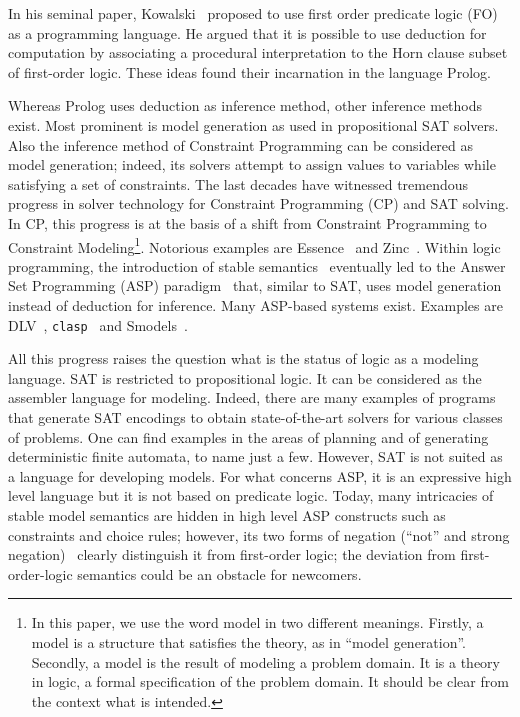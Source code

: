 \documentclass{tlp}
\renewcommand{\|}{\ensuremath{\,|\,}}
\renewcommand{\|}{\,|\,}
\begin{document}
In his seminal paper, Kowalski~\citeyear{ifip/Kowalski74} proposed to
use first order predicate logic (FO) as a programming language. He
argued that it is possible to use deduction for computation by
associating a procedural interpretation to the Horn clause subset of
first-order logic.  These ideas found their incarnation in the
language Prolog.

Whereas Prolog uses deduction as inference method, other
inference methods exist. Most prominent is model generation as used in
propositional SAT solvers. Also the inference method of Constraint
Programming can be considered as model generation; indeed, its solvers
attempt to assign values to variables while satisfying a set of
constraints.
%
The last decades have witnessed tremendous progress in solver
technology for Constraint Programming (CP) and SAT solving. In CP,
this progress is at the basis of a shift from Constraint Programming
to Constraint Modeling\footnote{In this paper, we use the word model
  in two different meanings. Firstly, a
  model is  a structure that satisfies the theory, as in ``model generation''.  Secondly, a model is the result of modeling a problem domain. It is  a theory in logic, a formal specification of the problem domain. It should be clear from the context what is   intended.}.
%
Notorious examples are {\sc
  Essence}~\cite{constraints/FrischHJHM08} and
Zinc~\cite{constraints/MarriottNRSBW08}.  Within logic programming,
the introduction of stable semantics~\cite{iclp/GelfondL88} eventually
led to the Answer Set Programming (ASP)
paradigm~\cite{cacm/BrewkaET11} that, similar to SAT, uses model
generation instead of deduction for inference. Many ASP-based systems
exist. Examples are DLV~\cite{tocl/LeonePFEGPS02},
\texttt{clasp}~\cite{lpnmr/GebserKNS07a} and Smodels~\cite{lpnmr/SyrjanenN01}.

All this progress raises the question what is the status of logic as a
modeling language. SAT is restricted to propositional logic. It can be
considered as the assembler language for modeling. Indeed, there
are many examples of programs that generate SAT encodings to obtain
state-of-the-art solvers for various classes of problems. One can find
examples in the areas of planning and of generating deterministic
finite automata, to name just a few. However, SAT is not suited as a
language for developing models.  For what concerns ASP, it is an
expressive high level language but it is not based on predicate logic. Today,
many intricacies of stable model semantics are hidden in high level
ASP constructs such as constraints and choice rules; however, its two
forms of negation (``not'' and strong negation)~\cite{cacm/BrewkaET11}
clearly distinguish it from first-order logic; the deviation from
first-order-logic semantics could be an obstacle for newcomers.
\end{document}

